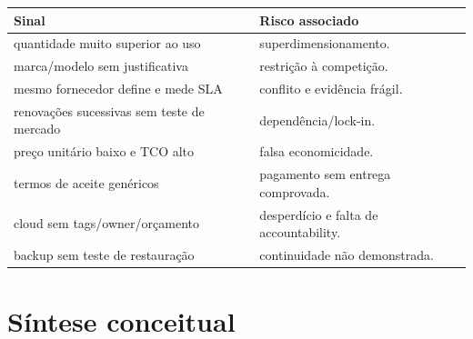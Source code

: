 \begin{table}[ht]
\centering
\small
\begin{tabularx}{\textwidth}{X X}
\toprule
Sinal & Risco associado \\
\midrule
quantidade muito superior ao uso & superdimensionamento. \\
marca/modelo sem justificativa & restrição à competição. \\
mesmo fornecedor define e mede SLA & conflito e evidência frágil. \\
renovações sucessivas sem teste de mercado & dependência/lock-in. \\
preço unitário baixo e TCO alto & falsa economicidade. \\
termos de aceite genéricos & pagamento sem entrega comprovada. \\
cloud sem tags/owner/orçamento & desperdício e falta de accountability. \\
backup sem teste de restauração & continuidade não demonstrada. \\
\bottomrule
\end{tabularx}
\end{table}

\section{Síntese conceitual}

